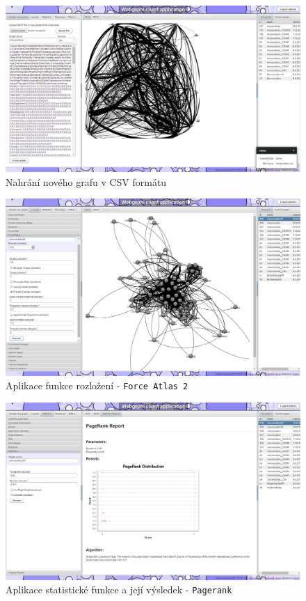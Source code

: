 \documentclass[thesis=M,czech]{FITthesis}[2014/05/6]
\begin{document}
\begin{figure}\centering
 	\includegraphics[width=1\textwidth]{images/prtsc/clientapp-04-new_graph}
 	\caption[Nahrání nového grafu]{Nahrání nového grafu v CSV formátu}\label{fig:clientapp-04-new_graph}
\end{figure}
\begin{figure}\centering
 	\includegraphics[width=1\textwidth]{images/prtsc/clientapp-05-layout}
 	\caption[Aplikace funkce rozložení]{Aplikace funkce rozložení - \texttt{Force Atlas 2}}\label{fig:clientapp-05-layout}
\end{figure}
\begin{figure}\centering
 	\includegraphics[width=1\textwidth]{images/prtsc/clientapp-05-statistics_pagerank}
 	\caption[Aplikace statistické funkce]{Aplikace statistické funkce a její výsledek - \texttt{Pagerank}}\label{fig:clientapp-05-statistics_pagerank}
\end{figure}
\end{document}
